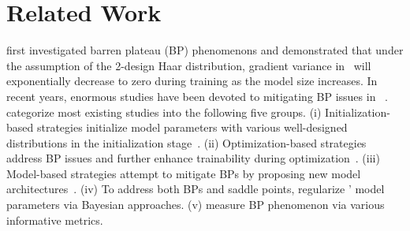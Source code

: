 \section{Related Work}
\label{sec:rewk}
\citet{McClean2018landscapes} first investigated barren plateau (BP) phenomenons and demonstrated that under the assumption of the 2-design Haar distribution, gradient variance in \qnns\ will exponentially decrease to zero during training as the model size increases. In recent years, enormous studies have been devoted to mitigating BP issues in \qnns~\cite{qi2023barren}. \citet{cunningham2024investigating} categorize most existing studies into the following five groups.
(i) Initialization-based strategies initialize model parameters with various well-designed distributions in the initialization stage~\cite{grant2019initialization, sack2022avoiding, mele2022avoiding, grimsley2023adaptive, liu2023mitigating, park2024hamiltonian}.
(ii) Optimization-based strategies address BP issues and further enhance trainability during optimization~\cite{ostaszewski2021structure, suzuki2021normalized, heyraud2023estimation, liu2024mitigating, sannia2024engineered}. %
(iii) Model-based strategies attempt to mitigate BPs by proposing new model architectures~\cite{li2021vsql, bharti2021simulator, du2022quantum, selvarajan2023dimensionality, tuysuz2023classical, Kashif2024resQNets}. %
(iv) To address both BPs and saddle points, \citet{zhuang2024improving} regularize \qnns' model parameters via Bayesian approaches.
(v) \citet{rappaport2023measurement} measure BP phenomenon via various informative metrics.